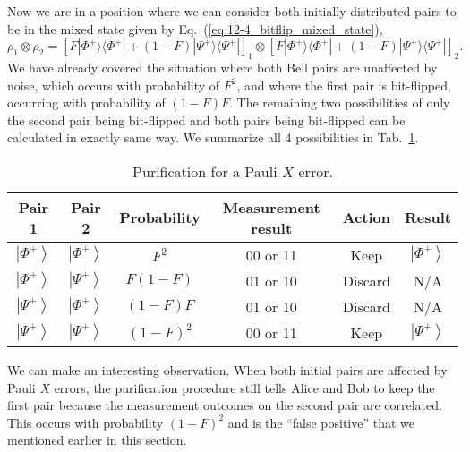 Now we are in a position where we can consider both initially distributed pairs to be in the mixed state given by Eq.~(\ref{eq:12-4_bitflip_mixed_state}),
\begin{equation}
    \rho_1 \otimes \rho_2 = \left[ F |\Phi^+\rangle \langle\Phi^+| + (1 - F) |\Psi^+\rangle \langle\Psi^+| \right]_1 \otimes \left[ F |\Phi^+\rangle \langle\Phi^+| + (1 - F) |\Psi^+\rangle \langle\Psi^+| \right]_2.
\end{equation}
We have already covered the situation where both Bell pairs are unaffected by noise, which occurs with probability of $F^2$, and where the first pair is bit-flipped, occurring with probability of $(1-F)F$.
The remaining two possibilities of only the second pair being bit-flipped and both pairs being bit-flipped can be calculated in exactly same way.
We summarize all 4 possibilities in Tab.~\ref{tab:12-4_purification_X_error}.
\begin{table}[t]
    \setcellgapes{3pt}
    \renewcommand\theadfont{}
    \makegapedcells
    \centering
    \begin{tabular}{cccccc}
        \hline
        \textbf{Pair 1} & \textbf{Pair 2} & \textbf{Probability} & \textbf{Measurement result} & \textbf{Action} & \textbf{Result} \\
        \hline
        $\left|\Phi^{+}\right\rangle$ & $\left|\Phi^{+}\right\rangle$ & $F^{2}$ & 00 or 11 & \textcolor{mygreen}{Keep} & $\left|\Phi^{+}\right\rangle$ \\
        $\left|\Phi^{+}\right\rangle$ & $\left|\Psi^{+}\right\rangle$ & $F(1-F)$ & 01 or 10 & \textcolor{myred}{Discard} & N/A \\
        $\left|\Psi^{+}\right\rangle$ & $\left|\Phi^{+}\right\rangle$ & $(1-F) F$ & 01 or 10 & \textcolor{myred}{Discard} & N/A \\
        $\left|\Psi^{+}\right\rangle$ & $\left|\Psi^{+}\right\rangle$ & $(1-F)^{2}$ & 00 or 11 & \textcolor{mygreen}{Keep} & $\left|\Psi^{+}\right\rangle$ \\
        \hline
    \end{tabular}
    \caption[X error purification.]{Purification for a Pauli $X$ error.}
    \label{tab:12-4_purification_X_error}
\end{table}

We can make an interesting observation.
When both initial pairs are affected by Pauli $X$ errors, the purification procedure still tells Alice and Bob to keep the first pair because the measurement outcomes on the second pair are correlated.
This occurs with probability $(1-F)^2$ and is the ``false positive'' that we mentioned earlier in this section.

